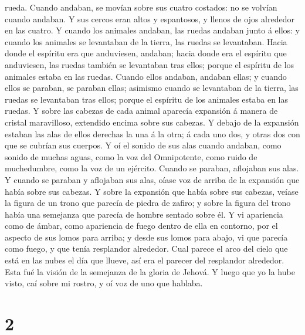 rueda.  Cuando andaban, se movían sobre sus cuatro
costados: no se volvían cuando andaban.  Y sus cercos
eran altos y espantosos, y llenos de ojos alrededor en las cuatro.
 Y cuando los animales andaban, las ruedas andaban junto
á ellos: y cuando los animales se levantaban de la tierra, las ruedas se
levantaban.  Hacia donde el espíritu era que anduviesen,
andaban; hacia donde era el espíritu que anduviesen, las ruedas también
se levantaban tras ellos; porque el espíritu de los animales estaba en
las ruedas.  Cuando ellos andaban, andaban ellas; y
cuando ellos se paraban, se paraban ellas; asimismo cuando se levantaban
de la tierra, las ruedas se levantaban tras ellos; porque el espíritu de
los animales estaba en las ruedas.  Y sobre las cabezas
de cada animal aparecía expansión á manera de cristal maravilloso,
extendido encima sobre sus cabezas.  Y debajo de la
expansión estaban las alas de ellos derechas la una á la otra; á cada
uno dos, y otras dos con que se cubrían sus cuerpos.  Y
oí el sonido de sus alas cuando andaban, como sonido de muchas aguas,
como la voz del Omnipotente, como ruido de muchedumbre, como la voz de
un ejército. Cuando se paraban, aflojaban sus alas.  Y
cuando se paraban y aflojaban sus alas, oíase voz de arriba de la
expansión que había sobre sus cabezas.  Y sobre la
expansión que había sobre sus cabezas, veíase la figura de un trono que
parecía de piedra de zafiro; y sobre la figura del trono había una
semejanza que parecía de hombre sentado sobre él.  Y vi
apariencia como de ámbar, como apariencia de fuego dentro de ella en
contorno, por el aspecto de sus lomos para arriba; y desde sus lomos
para abajo, vi que parecía como fuego, y que tenía resplandor alrededor.
 Cual parece el arco del cielo que está en las nubes el
día que llueve, así era el parecer del resplandor alrededor. Esta fué la
visión de la semejanza de la gloria de Jehová. Y luego que yo la hube
visto, caí sobre mi rostro, y oí voz de uno que hablaba.

\hypertarget{section-1}{%
\section{2}\label{section-1}}

